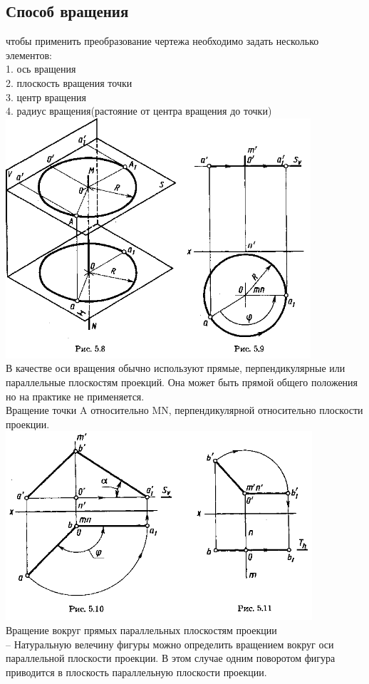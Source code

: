 \documentclass[a4paper, 12pt]{article}
\begin{document}
\subsection{Способ вращения}

чтобы применить преобразование чертежа необходимо задать  несколько элементов:\\
1. ось вращения\\
2. плоскость вращения точки\\
3. центр вращения\\
4. радиус вращения(растояние от центра вращения до точки)\\
\includegraphics{img/531.png}\\

В качестве оси вращения обычно используют прямые, перпендикулярные или параллельные плоскостям проекций. Она может быть прямой общего положения но на практике не применяется.\\

Вращение точки A относительно MN, перпендикулярной относительно плоскости проекции.\\
\includegraphics{img/532.png}\\

Вращение вокруг прямых параллельных плоскостям проекции\\
-- Натуральную велечину фигуры можно определить вращением вокруг оси параллельной плоскости проекции. В этом случае одним поворотом фигура приводится в плоскость параллельную плоскости проекции.\\
\end{document}
